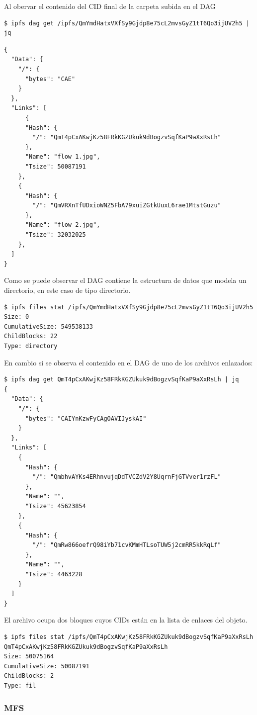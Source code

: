 Al obervar el contenido del CID final de la carpeta subida en el DAG

\begin{verbatim}
$ ipfs dag get /ipfs/QmYmdHatxVXfSy9Gjdp8e75cL2mvsGyZ1tT6Qo3ijUV2h5 | jq
\end{verbatim}
\begin{verbatim}
{
  "Data": {
    "/": {
      "bytes": "CAE"
    }
  },
  "Links": [
      {
      "Hash": {
        "/": "QmT4pCxAKwjKz58FRkKGZUkuk9dBogzvSqfKaP9aXxRsLh"
      },
      "Name": "flow 1.jpg",
      "Tsize": 50087191
    },
    {
      "Hash": {
        "/": "QmVRXnTfUDxioWNZ5FbA79xuiZGtkUuxL6rae1MtstGuzu"
      },
      "Name": "flow 2.jpg",
      "Tsize": 32032025
    },
  ]
}
\end{verbatim}

Como se puede observar el DAG contiene la estructura de datos que modela un directorio, en este caso de tipo directorio.
\begin{verbatim}
$ ipfs files stat /ipfs/QmYmdHatxVXfSy9Gjdp8e75cL2mvsGyZ1tT6Qo3ijUV2h5
Size: 0
CumulativeSize: 549538133
ChildBlocks: 22
Type: directory
\end{verbatim}

En cambio si se observa el contenido en el DAG de uno de los archivos enlazados:
\begin{verbatim}
$ ipfs dag get QmT4pCxAKwjKz58FRkKGZUkuk9dBogzvSqfKaP9aXxRsLh | jq
{
  "Data": {
    "/": {
      "bytes": "CAIYnKzwFyCAgOAVIJyskAI"
    }
  },
  "Links": [
    {
      "Hash": {
        "/": "QmbhvAYKs4ERhnvujqDdTVCZdV2Y8UqrnFjGTVver1rzFL"
      },
      "Name": "",
      "Tsize": 45623854
    },
    {
      "Hash": {
        "/": "QmRw866oefrQ98iYb71cvKMmHTLsoTUW5j2cmRR5kkRqLf"
      },
      "Name": "",
      "Tsize": 4463228
    }
  ]
}
\end{verbatim}
El archivo ocupa dos bloques cuyos CIDs están en la lista de enlaces del objeto.
\begin{verbatim}
$ ipfs files stat /ipfs/QmT4pCxAKwjKz58FRkKGZUkuk9dBogzvSqfKaP9aXxRsLh
QmT4pCxAKwjKz58FRkKGZUkuk9dBogzvSqfKaP9aXxRsLh
Size: 50075164
CumulativeSize: 50087191
ChildBlocks: 2
Type: fil
\end{verbatim}

\subsubsection{MFS}

